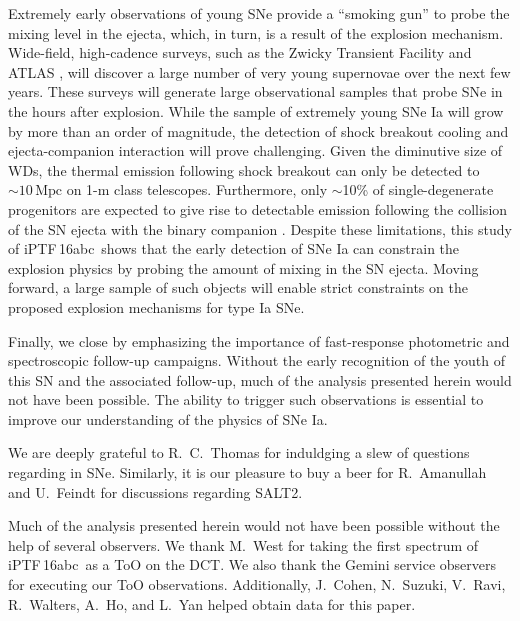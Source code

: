 \documentclass[twocolumn]{aastex61}
\newcommand{\abc}{iPTF\,16abc}
\begin{document}
Extremely early observations of young SNe provide a ``smoking
gun'' to probe the mixing level in the ejecta, which, in turn, is 
a result of the explosion mechanism. Wide-field, high-cadence surveys, such as the Zwicky Transient Facility \citep{2016PASP..128h4501B} and ATLAS \citep{2011PASP..123...58T,2013RSPTA.37120269T}, will discover a large number of very young supernovae over the next few years. These surveys will generate large observational samples that probe SNe in the hours after explosion. While the sample of extremely young SNe Ia will grow by more than an order of magnitude, the detection of shock breakout cooling and ejecta-companion interaction will prove challenging. Given the diminutive size of WDs, the thermal emission following shock breakout can only be detected to $\sim 10\,\mathrm{Mpc}$ on 1-m class telescopes. Furthermore, only $\sim$10\% of single-degenerate progenitors are expected to give rise to detectable emission following the collision of the SN ejecta with the binary companion \citep{2010ApJ...708.1025K}. Despite these limitations, this study of \abc\ shows that the early detection of SNe Ia can constrain the explosion physics by probing the amount of mixing in the SN ejecta. Moving forward, a large sample of such objects will enable strict constraints on the proposed explosion mechanisms for type Ia SNe.

Finally, we close by emphasizing the importance of fast-response photometric and spectroscopic follow-up campaigns. Without the early recognition of the youth of this SN and the associated follow-up, much of the analysis presented herein would not have been possible. The ability to trigger such observations is essential to improve our understanding of the physics of SNe Ia.

\acknowledgements

We are deeply grateful to R.~C.~Thomas for induldging a slew of questions regarding  in SNe. Similarly, it is our pleasure to buy a beer for R.~Amanullah and U.~Feindt for discussions regarding SALT2. 

Much of the analysis presented herein would not have been possible without the help of several observers. We thank M.~West for taking the first spectrum of \abc\ as a ToO on the DCT. We also thank the Gemini service observers for executing our ToO observations. Additionally, J.~Cohen, N.~Suzuki, V.~Ravi, R.~Walters, A.~Ho, and L.~Yan helped obtain data for this paper.

\end{document}
